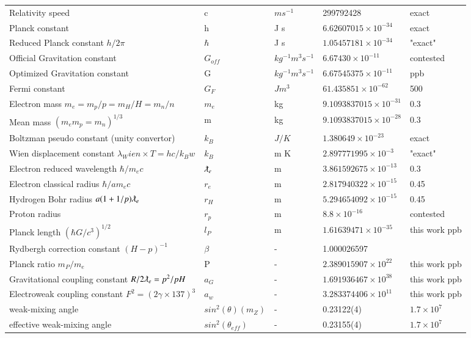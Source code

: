 \documentclass[a4paper,9pt]{article}
\begin{document}
\begin{appendix}
\begin{table}
\begin{tabular}{lllll}
 Relativity speed     & c   & $m s^{-1}$   & 299792428 & exact \\
 Planck constant     & h   & J s   & $6.62607015 \times 10^{-34}$ & exact \\
 Reduced Planck constant $h/2\pi$    & $\hbar$   & J s   & $1.05457181 \times 10^{-34}$ & "exact" \\
 Official Gravitation constant   & $G_{off}$ & $kg^{-1} m^3 s^{-1}$ & $6.67430 \times 10^{-11}$  &  contested\\
 Optimized Gravitation constant   & G & $kg^{-1} m^3 s^{-1}$  & $6.67545375\times 10^{-11}$  &  ppb\\
 Fermi constant  & $G_F$ & $J m^3$   & $61.435851 \times 10^{-62}$  &  500\\
 Electron mass $m_e = m_p/p = m_H/H = m_n/n$  & $m_e$ & kg  & $9.1093837015 \times 10^{-31}$  &  0.3\\
 Mean mass $(m_e  m_p =  m_n )^{1/3}$ & m & kg  & $9.1093837015\times 10^{-28}$  &  0.3\\
 Boltzman pseudo constant (unity convertor) & $k_B$ & $J /K$  & $1.380649 \times 10^{-23}$  &  exact \\
 Wien displacement constant  $\lambda_Wien \times T = hc/k_Bw$ & $k_B$ &  m K  & $2.897771995 \times 10^{-3}$  &  "exact"\\
 Electron reduced wavelength $\hbar/m_ec$ & $\lambdabar_e$ &  m   & $3.861592675\times 10^{-13}$  & 0.3\\
 Electron classical radius $\hbar/am_ec$ & $r_e$ &  m   & $2.817940322\times 10^{-15}$  & 0.45\\
 Hydrogen Bohr radius $a(1+1/p)\lambdabar_e$ & $r_H$ &  m   & $5.294654092 \times 10^{-15}$  & 0.45\\
 Proton radius  & $r_p$ &  m   & $8.8\times 10^{-16}$  & contested\\
 Planck length $(\hbar G /c^3)^{1/2}$ & $l_P$  & m  & $1.61639471 \times 10^{-35}$ & this work ppb  \\
 Rydbergh correction constant $(H-p)^{-1}$ & $\beta$  & -  & 1.000026597 &   \\
 Planck ratio $m_P/m_e$ & P  & -  & $2.389015907 \times 10^{22}$ & this work ppb  \\
 Gravitational coupling constant $R/2\lambdabar_e = p^2/pH$ & $a_G$   & -  & $1.691936467 \times 10^{38}$ & this work ppb  \\
 Electroweak coupling constant $F^2 = (2\gamma\times 137)^3$ & $a_w$   & -  & $3.283374406 \times 10^{11}$ & this work ppb  \\
 weak-mixing angle & $sin^2(\theta)(m_Z)$   & -  & 0.23122(4) & $1.7 \times 10^7$  \\
 effective weak-mixing angle & $sin^2(\theta_{eff})$   & -  & 0.23155(4) & $1.7 \times 10^7$  \\
  

\end{tabular}
\end{table}
\end{appendix}
\end{document}
